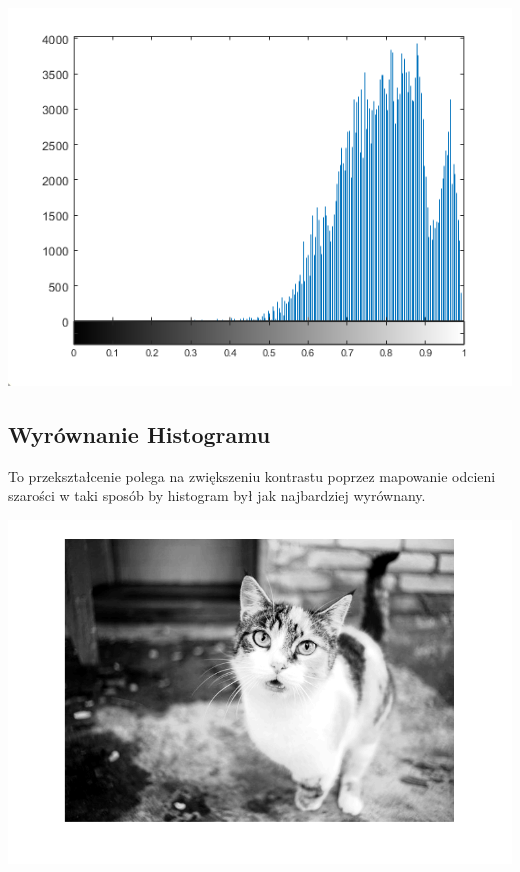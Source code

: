 \documentclass{article}
\begin{document}
	\begin{center}
		\includegraphics[width=\linewidth]{../../lab02/cat_gamma_hist.png}
		\label{fig:cat_gamma_hist}
	\end{center}
	
	
	\subsection{Wyrównanie Histogramu}
	To przekształcenie polega na zwiększeniu kontrastu poprzez mapowanie odcieni szarości w taki sposób by histogram był jak najbardziej wyrównany.
	
	\begin{center}
	\includegraphics[width=\linewidth]{../../lab02/cat_eq.png}
	\label{fig:cat_eq}
	\end{center}
	
\end{document}
